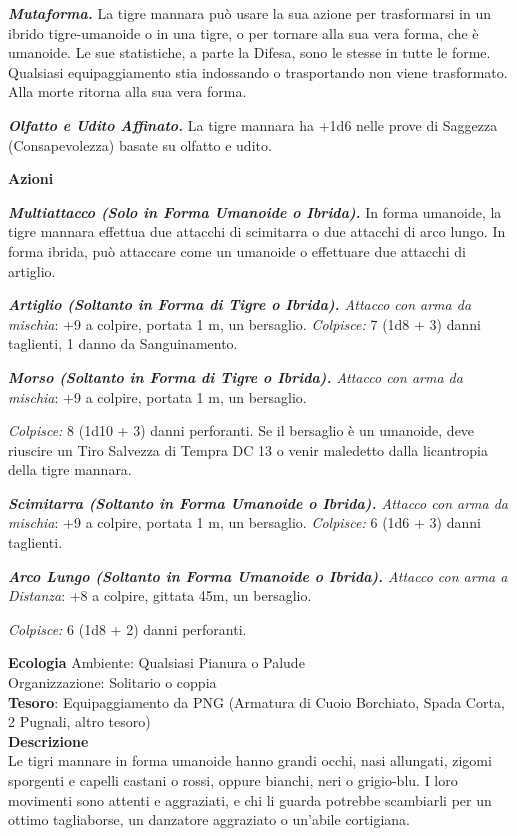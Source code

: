 \begin{multicols}{2}
	\textit{\textbf{Mutaforma.}} La tigre mannara può usare la sua azione per trasformarsi in un ibrido tigre-umanoide o in una tigre, o per tornare alla sua vera forma, che è umanoide. Le sue statistiche, a parte la Difesa, sono le stesse in tutte le forme. Qualsiasi equipaggiamento stia indossando o trasportando non viene trasformato. Alla morte ritorna alla sua vera forma.

	\textit{\textbf{Olfatto e Udito Affinato.}} La tigre mannara ha +1d6 nelle prove di Saggezza (Consapevolezza) basate su olfatto e udito.

	\textbf{Azioni}

	\textit{\textbf{Multiattacco (Solo in Forma Umanoide o Ibrida).}} In forma umanoide, la tigre mannara effettua due attacchi di scimitarra o due attacchi di arco lungo. In forma ibrida, può attaccare come un umanoide o effettuare due attacchi di artiglio.

	\textit{\textbf{Artiglio (Soltanto in Forma di Tigre o Ibrida).} Attacco con arma da mischia}: +9 a colpire, portata 1 m, un bersaglio. \textit{Colpisce:} 7 (1d8 + 3) danni taglienti, 1 danno da Sanguinamento.

	\textit{\textbf{Morso (Soltanto in Forma di Tigre o Ibrida).} Attacco con arma da mischia}: +9 a colpire, portata 1 m, un bersaglio.

	\textit{Colpisce:} 8 (1d10 + 3) danni perforanti. Se il bersaglio è un umanoide, deve riuscire un Tiro Salvezza di Tempra DC 13 o venir maledetto dalla licantropia della tigre mannara.

	\textit{\textbf{Scimitarra (Soltanto in Forma Umanoide o Ibrida).} Attacco con arma da mischia}: +9 a colpire, portata 1 m, un bersaglio. \textit{Colpisce:} 6 (1d6 + 3) danni taglienti.

	\textit{\textbf{Arco Lungo (Soltanto in Forma Umanoide o Ibrida).} Attacco con arma a Distanza}: +8 a colpire, gittata 45m, un bersaglio.

	\textit{Colpisce:} 6 (1d8 + 2) danni perforanti.

	\textbf{Ecologia}
	Ambiente: Qualsiasi Pianura o Palude\\
	Organizzazione: Solitario o coppia\\
	\textbf{Tesoro}: Equipaggiamento da PNG (Armatura di Cuoio Borchiato, Spada Corta, 2 Pugnali, altro tesoro)\\
	\textbf{Descrizione}\\
	Le tigri mannare in forma umanoide hanno grandi occhi, nasi allungati, zigomi sporgenti e capelli castani o rossi, oppure bianchi, neri o grigio-blu. I loro movimenti sono attenti e aggraziati, e chi li guarda potrebbe scambiarli per un ottimo tagliaborse, un danzatore aggraziato o un'abile cortigiana.



\end{multicols}
